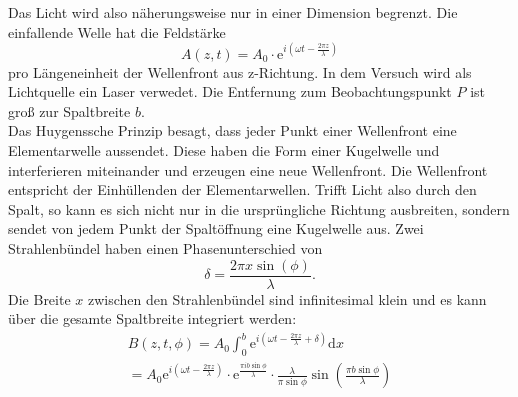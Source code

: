 Das Licht wird also näherungsweise nur in einer Dimension begrenzt.
Die einfallende Welle hat die Feldstärke
\begin{equation*}
    A(z,t) = A_0 \cdot \mathrm{e}^{i(\omega t - \frac{2 \pi z}{\lambda})}
\end{equation*}
pro Längeneinheit der Wellenfront aus z-Richtung.
In dem Versuch wird als Lichtquelle ein Laser verwedet.
Die Entfernung zum Beobachtungspunkt $P$ ist groß zur Spaltbreite $b$.
\\
Das Huygenssche Prinzip besagt, dass jeder Punkt einer Wellenfront eine Elementarwelle aussendet.
Diese haben die Form einer Kugelwelle und interferieren miteinander und erzeugen eine neue Wellenfront.
Die Wellenfront entspricht der Einhüllenden der Elementarwellen.
Trifft Licht also durch den Spalt, so kann es sich nicht nur in die ursprüngliche Richtung ausbreiten, sondern sendet von jedem Punkt der Spaltöffnung eine Kugelwelle aus.
Zwei Strahlenbündel haben einen Phasenunterschied von
\begin{equation}
    \delta = \frac{2\pi x \sin (\phi)}{\lambda} .
\end{equation}
Die Breite $x$ zwischen den Strahlenbündel sind infinitesimal klein und es kann über die gesamte Spaltbreite integriert werden:
\begin{align*}
    B(z,t,\phi) = A_0 \int_0^b \mathrm{e}^{i(\omega t - \frac{2 \pi z}{\lambda} + \delta)} \mathrm{d}x \\
   = A_0 \mathrm{e}^{i \left (\omega t - \frac{2 \pi z}{\lambda} \right )} \cdot \mathrm{e}^{\frac{\pi i b \sin \phi}{\lambda}} \cdot \frac{\lambda}{\pi \sin \phi} \sin \left (\frac{\pi b \sin \phi}{\lambda} \right )
\end{align*}

